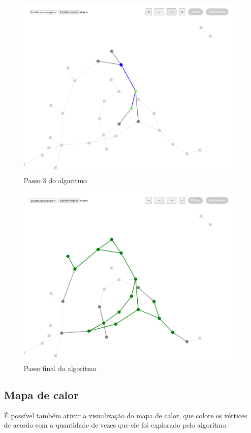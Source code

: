 \begin{figure}[!htb]
\centering
\includegraphics[width=12cm]{GrafoSteps3.png}
\caption{Passo 3 do algoritmo}
\label{fig:grafo-steps-3}
\end{figure}

\begin{figure}[!htb]
\centering
\includegraphics[width=12cm]{GrafoStepsN.png}
\caption{Passo final do algoritmo}
\label{fig:grafo-steps-n}
\end{figure}

\subsection{Mapa de calor}
É possível também ativar a visualização do mapa de calor, que colore os vértices de acordo com a quantidade de vezes que ele foi explorado pelo algoritmo.

